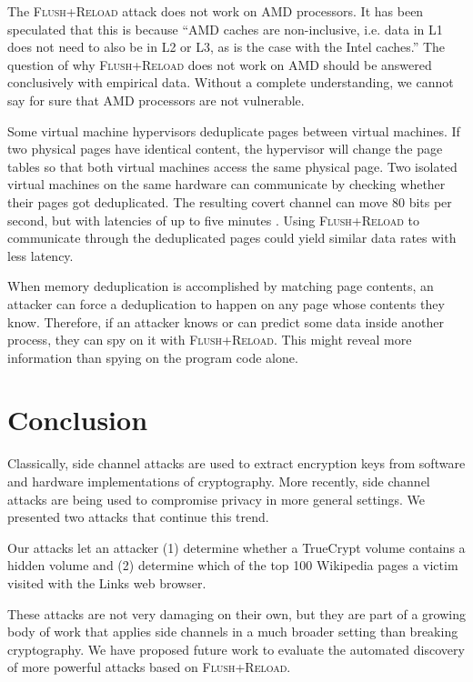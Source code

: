 \documentclass{acm_proc_article-sp}
\begin{document}
The \textsc{Flush+Reload} attack does not work on AMD processors. It has been speculated
that this is because ``AMD caches are non-inclusive, i.e. data in L1 does not
need to also be in L2 or L3, as is the case with the Intel caches.''
\cite{yarom2013flush} The question of why \textsc{Flush+Reload} does not work on AMD
should be answered conclusively with empirical data. Without a complete
understanding, we cannot say for sure that AMD processors are not vulnerable. 

Some virtual machine hypervisors deduplicate pages between virtual machines. If
two physical pages have identical content, the hypervisor will change the page
tables so that both virtual machines access the same physical page. Two isolated
virtual machines on the same hardware can communicate by checking whether their
pages got deduplicated. The resulting covert channel can move 80 bits per
second, but with latencies of up to five minutes \cite{xiao2013security}. Using
\textsc{Flush+Reload} to communicate through the deduplicated pages could yield
similar data rates with less latency.

When memory deduplication is accomplished by matching page contents, an attacker
can force a deduplication to happen on any page whose contents they know.
Therefore, if an attacker knows or can predict some data inside another process,
they can spy on it with \textsc{Flush+Reload}. This might reveal more
information than spying on the program code alone.

\section{Conclusion}
\label{sec:conclusion}

Classically, side channel attacks are used to extract encryption keys from
software and hardware implementations of cryptography. More recently, side
channel attacks are being used to compromise privacy in more general settings.
We presented two attacks that continue this trend. 

Our attacks let an attacker (1) determine whether a TrueCrypt volume contains
a hidden volume and (2) determine which of the top 100 Wikipedia pages a victim
visited with the Links web browser.

These attacks are not very damaging on their own, but they are part of a growing
body of work that applies side channels in a much broader setting than breaking
cryptography. We have proposed future work to evaluate the automated discovery
of more powerful attacks based on \textsc{Flush+Reload}.
\end{document}
